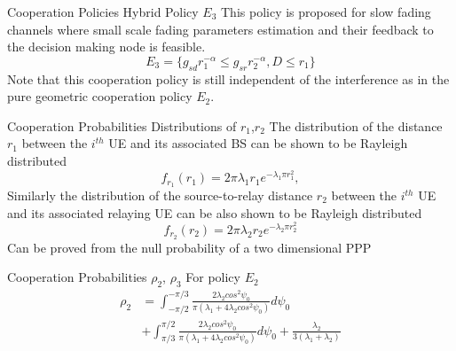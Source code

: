 \documentclass{beamer}
\begin{document}
\begin{frame}{Cooperation Policies} {Hybrid Policy $E_3$}
This policy is proposed for slow fading channels where small scale fading parameters estimation and their
feedback to the decision making node is feasible. 
\begin{equation*}
E_3 = \{g_{sd}r_1^{-\alpha} \leq g_{sr}r_2^{-\alpha}, D \leq r_1 \}
\end{equation*}
Note that this cooperation policy is still independent of the
interference as in the pure geometric cooperation policy $E_2$.
\end{frame}


\begin{frame}{Cooperation Probabilities} {Distributions of $r_1$,$r_2$}
The distribution of the distance
$r_1$ between the $i^{th}$ UE and its associated BS can be shown to
be Rayleigh distributed 
\begin{equation*}
f_{r_1}(r_1) = 2\pi\lambda_1r_1e^{-\lambda_1\pi r_1^2},
\end{equation*}
\pause
Similarly the distribution of the source-to-relay
distance $r_2$ between the $i^{th}$ UE and its associated relaying UE
can be also shown to be Rayleigh distributed
\begin{equation*}
f_{r_2}(r_2) = 2\pi\lambda_2r_2e^{-\lambda_2\pi r_2^2}
\end{equation*}
\pause
Can be proved from the null probability of a two dimensional PPP
\end{frame}

\begin{frame}{Cooperation Probabilities} {$\rho_2$, $\rho_3$}
For policy $E_2$
\begin{align*}
\rho_2 &= \int_{-\pi/2}^{-\pi/3}\frac{2\lambda_2 cos^2\psi_0}{\pi(\lambda_1+4\lambda_2cos^2\psi_0)}d\psi_0 \\ &+ \int_{\pi/3}^{\pi/2}\frac{2\lambda_2 
cos^2\psi_0}{\pi(\lambda_1+4\lambda_2cos^2\psi_0)}d\psi_0 + \frac{\lambda_2}{3(\lambda_1+\lambda_2)}
\end{align*}
\end{frame}
\end{document}
